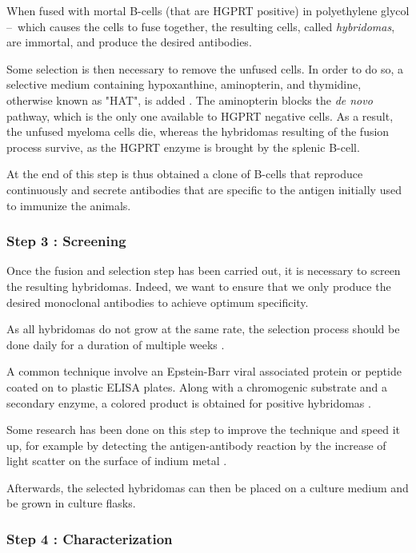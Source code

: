 When fused with mortal B-cells (that are HGPRT positive)
in polyethylene glycol --~which causes the cells to fuse together,
the resulting cells, called \emph{hybridomas}, are immortal,
and produce the desired antibodies.

Some selection is then necessary to remove the unfused cells. In order
to do so, a selective medium containing hypoxanthine, aminopterin, and 
thymidine, otherwise known as "HAT", is added \cite{nelson_monoclonal_2000}. 
The aminopterin blocks the \emph{de novo} pathway, which is the only one 
available to HGPRT negative cells. As a result, the unfused myeloma cells die,
whereas the hybridomas resulting of the fusion process survive, as the
HGPRT enzyme is brought by the splenic B-cell.

At the end of this step is thus obtained a clone of B-cells that reproduce
continuously and secrete antibodies that are specific to the antigen
initially used to immunize the animals.

\subsubsection{Step 3 : Screening}

Once the fusion and selection step has been carried out, it is necessary
to screen the resulting hybridomas. Indeed, we want to ensure that we
only produce the desired monoclonal antibodies to achieve optimum
specificity.

As all hybridomas do not grow at the same rate, the selection process
should be done daily for a duration of multiple weeks \cite{nelson_monoclonal_2000}.

A common technique involve an Epstein-Barr viral associated protein or peptide
coated on to plastic ELISA plates. Along with a chromogenic substrate and a
secondary enzyme, a colored product is obtained
for positive hybridomas \cite{grunow_cell_1994} \cite{nelson_monoclonal_2000}.

Some research has been done on this step to improve the technique and
speed it up, for example by detecting the antigen-antibody reaction by the 
increase of light scatter on the surface of indium metal \cite{rej_screening_1988}.

Afterwards, the selected hybridomas can then be placed on a culture medium
and be grown in culture flasks.

\subsubsection{Step 4 : Characterization}

